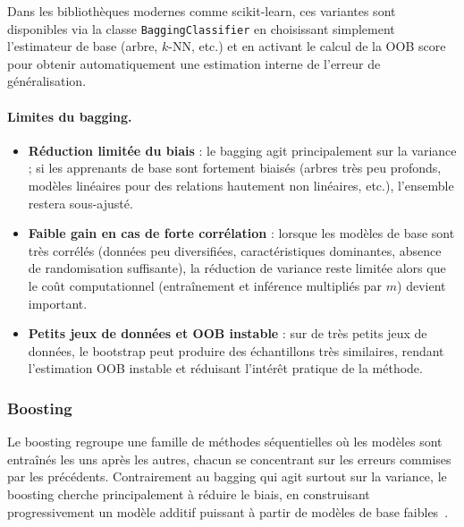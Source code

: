 Dans les bibliothèques modernes comme scikit-learn, ces variantes sont disponibles via la
classe \texttt{BaggingClassifier} en choisissant simplement l'estimateur de base (arbre,
$k$-NN, etc.) et en activant le calcul de la \og OOB score \fg{} pour obtenir automatiquement
une estimation interne de l'erreur de généralisation.

\paragraph{Limites du bagging.}
\begin{itemize}
  \item \textbf{Réduction limitée du biais} : le bagging agit principalement sur la variance ; si les
  apprenants de base sont fortement biaisés (arbres très peu profonds, modèles linéaires pour
  des relations hautement non linéaires, etc.), l'ensemble restera sous-ajusté.
  \item \textbf{Faible gain en cas de forte corrélation} : lorsque les modèles de base sont très corrélés
  (données peu diversifiées, caractéristiques dominantes, absence de randomisation suffisante),
  la réduction de variance reste limitée alors que le coût computationnel (entraînement et
  inférence multipliés par $m$) devient important.
  \item \textbf{Petits jeux de données et OOB instable} : sur de très petits jeux de données, le
  bootstrap peut produire des échantillons très similaires, rendant l'estimation OOB instable
  et réduisant l'intérêt pratique de la méthode.
\end{itemize}

\subsubsection{Boosting}

Le boosting regroupe une famille de méthodes séquentielles où les modèles sont entraînés les
uns après les autres, chacun se concentrant sur les erreurs commises par les précédents. Contrairement
au bagging qui agit surtout sur la variance, le boosting cherche principalement à
réduire le biais, en construisant progressivement un modèle additif puissant à partir de
modèles de base faibles~\cite{freund_schapire_adaboost_1997,schapire_boosting_intro_1999,mlm_bagging_vs_boosting_vs_stacking,greatlearning_bagging_boosting}.

